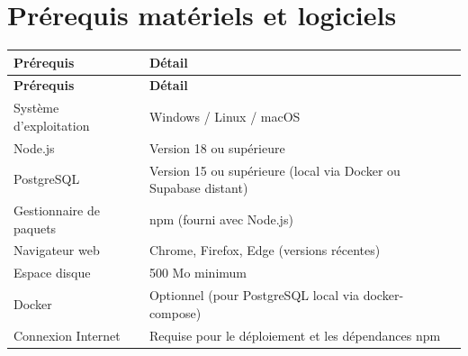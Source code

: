 \documentclass[12pt,a4paper]{report}
\begin{document}
\section{Prérequis matériels et logiciels}
\begin{longtable}{|p{5cm}|p{9.5cm}|}
\hline
\textbf{Prérequis} & \textbf{Détail} \\
\hline
\endfirsthead
\hline
\textbf{Prérequis} & \textbf{Détail} \\
\hline
\endhead
Système d'exploitation & Windows / Linux / macOS \\
\hline
Node.js & Version 18 ou supérieure \\
\hline
PostgreSQL & Version 15 ou supérieure (local via Docker ou Supabase distant) \\
\hline
Gestionnaire de paquets & npm (fourni avec Node.js) \\
\hline
Navigateur web & Chrome, Firefox, Edge (versions récentes) \\
\hline
Espace disque & 500 Mo minimum \\
\hline
Docker & Optionnel (pour PostgreSQL local via docker-compose) \\
\hline
Connexion Internet & Requise pour le déploiement et les dépendances npm \\
\hline
\end{longtable}
 
\end{document}

